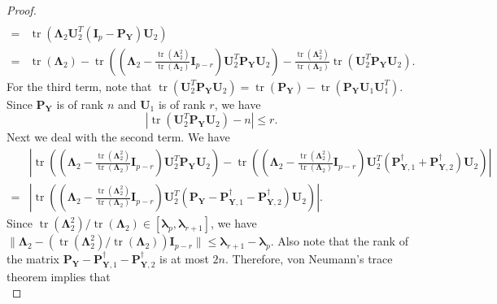 \documentclass[12pt]{article} %
\DeclareMathOperator{\mytr}{tr}
\newcommand{\bP}{\mathbf{P}}
\newcommand{\bY}{\mathbf{Y}}
\newcommand{\bI}{\mathbf{I}}
\newcommand{\bU}{\mathbf{U}}
\newcommand{\bfsym}[1]{\ensuremath{\boldsymbol{#1}}}
\def\blambda {\bfsym {\lambda}}
\def\bLambda {\bfsym {\Lambda}}
\theoremstyle{definition}
\begin{document}
\begin{appendices}
\begin{proof}
\begin{equation}
\begin{split}
    \\
    =&
        \mytr\left(
          \bLambda_2 \bU_2^T (\bI_p- \bP_{\bY})\bU_2 
    \right)
    \\
    =&
    \mytr(\bLambda_2)
    -
        \mytr\left(
            \left(\bLambda_2-\frac{\mytr(\bLambda_2^2)}{\mytr(\bLambda_2)}\bI_{p-r}\right) \bU_2^T \bP_{\bY} \bU_2 
    \right)
    -
    \frac{\mytr(\bLambda_2^2)}{\mytr(\bLambda_2)}
        \mytr\left(
           \bU_2^T \bP_{\bY} \bU_2 
       \right).
        \end{split}
    \end{equation}
    For the third term, note that
    $
        \mytr\left(
           \bU_2^T \bP_{\bY} \bU_2 
       \right)
       =
       \mytr(\bP_\bY)
       -
        \mytr\left(
            \bP_{\bY} \bU_1 \bU_1^T
       \right)
       $.
       Since $\bP_{\bY}$ is of rank $n$ and $\bU_1$ is of rank $r$, we have
       \begin{equation}\label{ranklr}
       |
        \mytr\left(
           \bU_2^T \bP_{\bY} \bU_2 
       \right)
       -
       n
       |
       \leq r
       .
       \end{equation}
       Next we deal with the second term.
       We have
       \begin{equation*}
           \begin{split}
        &\left|
        \mytr\left(
            \left(\bLambda_2-\frac{\mytr(\bLambda_2^2)}{\mytr(\bLambda_2)}\bI_{p-r}\right) \bU_2^T \bP_{\bY} \bU_2 
    \right)
    -
        \mytr\left(
            \left(\bLambda_2-\frac{\mytr(\bLambda_2^2)}{\mytr(\bLambda_2)}\bI_{p-r}\right) \bU_2^T \left(\bP_{\bY,1}^\dagger+\bP_{\bY,2}^\dagger\right) \bU_2 
    \right)
    \right|\\
    =&
    \left|
        \mytr\left(
            \left(\bLambda_2-\frac{\mytr(\bLambda_2^2)}{\mytr(\bLambda_2)}\bI_{p-r}\right) \bU_2^T \left(\bP_{\bY}-\bP_{\bY,1}^\dagger-\bP_{\bY,2}^\dagger\right) \bU_2 
    \right)
    \right|.
           \end{split}
       \end{equation*}
       Since ${\mytr(\bLambda_2^2)}/{\mytr(\bLambda_2)}\in[\blambda_{p},\blambda_{r+1}]$, we have
       $\|\bLambda_2-({\mytr(\bLambda_2^2)}/{\mytr(\bLambda_2)})\bI_{p-r}\|\leq \blambda_{r+1}-\blambda_p$.
       Also note that the rank of the matrix $\bP_{\bY}-\bP_{\bY,1}^\dagger-\bP_{\bY,2}^\dagger$ is at most $2n$.
       Therefore, von Neumann's trace theorem implies that
       \begin{equation}\label{jojo1}

\end{equation}
\end{proof}
\end{appendices}
\end{document}
